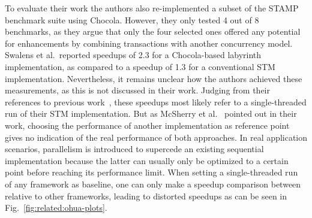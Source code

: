 To evaluate their work the authors also re-implemented a subset of the STAMP benchmark suite using Chocola.
However, they only tested 4 out of 8 benchmarks, as they argue that only the four selected ones offered any potential for enhancements by combining transactions with another concurrency model.
Swalens et al.\ reported speedups of 2.3 for a Chocola-based labyrinth implementation, as compared to a speedup of 1.3 for a conventional STM implementation.
Nevertheless, it remains unclear how the authors achieved these measurements, as this is not discussed in their work.
Judging from their references to previous work~\cite{swalens2016transactional, swalens2017transactional}, these speedups most likely refer to a single-threaded run of their STM implementation.
But as McSherry et al.~\cite{mcsherry2015scalability} pointed out in their work, choosing the performance of another implementation as reference point gives no indication of the real performance of both approaches.
In real application scenarios, parallelism is introduced to supercede an existing sequential implementation because the latter can usually only be optimized to a certain point before reaching its performance limit.
When setting a single-threaded run of any framework as baseline, one can only make a speedup comparison between relative to other frameworks, leading to distorted speedups as can be seen in Fig.~\ref{fig:related:ohua-plots}.

